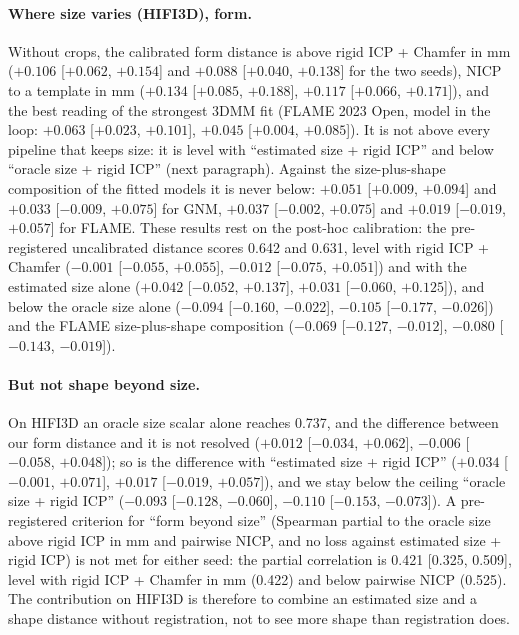 \documentclass[10pt,twocolumn,letterpaper]{article}
\begin{document}
\paragraph{Where size varies (HIFI3D), form.} Without crops, the calibrated form distance is above rigid ICP + Chamfer in mm ($+0.106$ [$+0.062$, $+0.154$] and $+0.088$ [$+0.040$, $+0.138$] for the two seeds), NICP to a template in mm ($+0.134$ [$+0.085$, $+0.188$], $+0.117$ [$+0.066$, $+0.171$]), and the best reading of the strongest 3DMM fit (FLAME 2023 Open, model in the loop: $+0.063$ [$+0.023$, $+0.101$], $+0.045$ [$+0.004$, $+0.085$]). It is not above every pipeline that keeps size: it is level with ``estimated size + rigid ICP'' and below ``oracle size + rigid ICP'' (next paragraph). Against the size-plus-shape composition of the fitted models it is never below: $+0.051$ [$+0.009$, $+0.094$] and $+0.033$ [$-0.009$, $+0.075$] for GNM, $+0.037$ [$-0.002$, $+0.075$] and $+0.019$ [$-0.019$, $+0.057$] for FLAME. These results rest on the post-hoc calibration: the pre-registered uncalibrated distance scores 0.642 and 0.631, level with rigid ICP + Chamfer ($-0.001$ [$-0.055$, $+0.055$], $-0.012$ [$-0.075$, $+0.051$]) and with the estimated size alone ($+0.042$ [$-0.052$, $+0.137$], $+0.031$ [$-0.060$, $+0.125$]), and below the oracle size alone ($-0.094$ [$-0.160$, $-0.022$], $-0.105$ [$-0.177$, $-0.026$]) and the FLAME size-plus-shape composition ($-0.069$ [$-0.127$, $-0.012$], $-0.080$ [$-0.143$, $-0.019$]).

\paragraph{But not shape beyond size.} On HIFI3D an oracle size scalar alone reaches 0.737, and the difference between our form distance and it is not resolved ($+0.012$ [$-0.034$, $+0.062$], $-0.006$ [$-0.058$, $+0.048$]); so is the difference with ``estimated size + rigid ICP'' ($+0.034$ [$-0.001$, $+0.071$], $+0.017$ [$-0.019$, $+0.057$]), and we stay below the ceiling ``oracle size + rigid ICP'' ($-0.093$ [$-0.128$, $-0.060$], $-0.110$ [$-0.153$, $-0.073$]). A pre-registered criterion for ``form beyond size'' (Spearman partial to the oracle size above rigid ICP in mm and pairwise NICP, and no loss against estimated size + rigid ICP) is not met for either seed: the partial correlation is 0.421 [0.325, 0.509], level with rigid ICP + Chamfer in mm (0.422) and below pairwise NICP (0.525). The contribution on HIFI3D is therefore to combine an estimated size and a shape distance without registration, not to see more shape than registration does.
\end{document}
